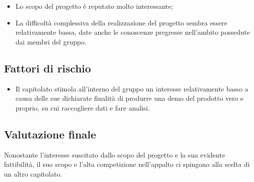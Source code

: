 \documentclass[openany,12pt,a4paper]{report}
\begin{document}
\begin{itemize}
    \item Lo scopo del progetto è reputato molto interessante;
    
    \item La difficoltà complessiva della realizzazione del progetto sembra essere relativamente bassa, date anche le conoscenze pregresse nell'ambito possedute dai membri del gruppo.
\end{itemize}

\subsection{Fattori di rischio}

\begin{itemize}
    \item Il capitolato stimola all'interno del gruppo un interesse relativamente basso a causa delle sue dichiarate finalità di produrre una demo del prodotto vero e proprio, su cui raccogliere dati e fare analisi.
\end{itemize}

\subsection{Valutazione finale}

Nonostante l'interesse suscitato dallo scopo del progetto e la sua evidente fattibilità, il suo scopo e l'alta competizione nell'appalto ci spingono alla scelta di un altro capitolato.
\end{document}
